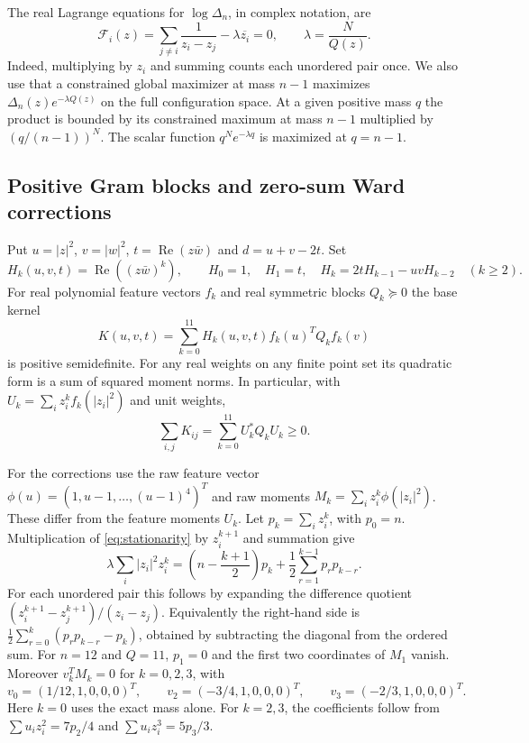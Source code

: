 \documentclass[11pt,letterpaper]{article}
\theoremstyle{remark}
\newcommand{\RePart}{\operatorname{Re}}
\begin{document}
The real Lagrange equations for \(\log\Delta_n\), in complex notation, are
\begin{equation}
 \mathcal F_i(z)=
 \sum_{j\ne i}\frac{1}{z_i-z_j}-\lambda\overline{z_i}=0,
 \qquad \lambda=\frac{N}{Q(z)}.
 \label{eq:stationarity}
\end{equation}
Indeed, multiplying by \(z_i\) and summing counts each unordered pair once.
We also use that a constrained global maximizer at mass \(n-1\) maximizes
\(\Delta_n(z)e^{-\lambda Q(z)}\) on the full configuration space. At a
given positive mass \(q\) the product is bounded by its constrained maximum
at mass \(n-1\) multiplied by \((q/(n-1))^N\). The scalar function
\(q^N e^{-\lambda q}\) is maximized at \(q=n-1\).

\subsection{Positive Gram blocks and zero-sum Ward corrections}
Put \(u=|z|^2\), \(v=|w|^2\), \(t=\RePart(z\bar w)\) and
\(d=u+v-2t\). Set
\[
 H_k(u,v,t)=\RePart((z\bar w)^k),\qquad H_0=1,\quad H_1=t,\quad
 H_k=2tH_{k-1}-uvH_{k-2}\quad(k\ge2).
\]
For real polynomial feature vectors \(f_k\) and real symmetric blocks
\(Q_k\succeq0\) the base kernel
\begin{equation}
 K(u,v,t)=\sum_{k=0}^{11}H_k(u,v,t) f_k(u)^T Q_k f_k(v)
 \label{eq:base-kernel}
\end{equation}
is positive semidefinite. For any real weights on any finite point set
its quadratic form is a sum of squared moment norms. In particular, with
\(U_k=\sum_i z_i^k f_k(|z_i|^2)\) and unit weights,
\begin{equation}
 \sum_{i,j}K_{ij}=\sum_{k=0}^{11}U_k^*Q_k U_k\ge0.
 \label{eq:gram-sum}
\end{equation}

For the corrections use the raw feature vector
\(\phi(u)=(1,u-1,\ldots,(u-1)^4)^T\) and raw moments
\(M_k=\sum_i z_i^k\phi(|z_i|^2)\). These differ from the feature moments
\(U_k\). Let \(p_k=\sum_i z_i^k\), with \(p_0=n\). Multiplication of
\eqref{eq:stationarity} by \(z_i^{k+1}\) and summation give
\begin{equation}
 \lambda\sum_i |z_i|^2z_i^k
 =\left(n-\frac{k+1}{2}\right)p_k+
   \frac12\sum_{r=1}^{k-1}p_rp_{k-r}.
 \label{eq:ward-general}
\end{equation}
For each unordered pair this follows by expanding the difference quotient
\((z_i^{k+1}-z_j^{k+1})/(z_i-z_j)\). Equivalently the right-hand side is
\(\tfrac12\sum_{r=0}^k(p_rp_{k-r}-p_k)\), obtained by subtracting the diagonal
from the ordered sum. For \(n=12\) and \(Q=11\), \(p_1=0\) and the first
two coordinates of \(M_1\) vanish. Moreover \(v_k^T M_k=0\) for \(k=0,2,3\), with
\begin{equation}
 v_0=(1/12,1,0,0,0)^T,\qquad
 v_2=(-3/4,1,0,0,0)^T,\qquad
 v_3=(-2/3,1,0,0,0)^T.
 \label{eq:ward-directions}
\end{equation}
Here \(k=0\) uses the exact mass alone. For \(k=2,3\), the coefficients
follow from \(\sum u_i z_i^2=7p_2/4\) and
\(\sum u_i z_i^3=5p_3/3\).
\end{document}

